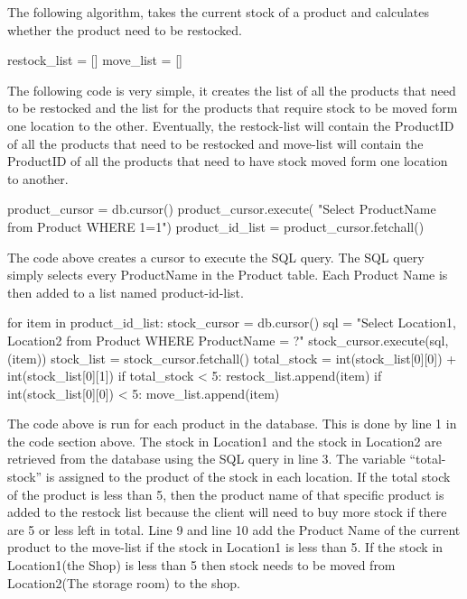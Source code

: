 The following algorithm, takes the current stock of a product and calculates whether the product need to be restocked.


\begin{python}
restock_list = []
move_list = []
\end{python}

The following code is very simple, it creates the list of all the products that need to be restocked and the list for the products that require stock to be moved form one location to the other. Eventually, the restock-list will contain the ProductID of all the products that need to be restocked and move-list will contain the ProductID of all the products that need to have stock moved form one location to another.


\begin{python}
product_cursor = db.cursor()
product_cursor.execute( "Select ProductName from Product WHERE 1=1")
product_id_list = product_cursor.fetchall()
\end{python}

The code above creates a cursor to execute the SQL query. The SQL query simply selects every ProductName in the Product table. Each Product Name is then added to a list named product-id-list. 

\begin{python}
for item in product_id_list:
            stock_cursor = db.cursor()
            sql = "Select Location1, Location2 from Product WHERE ProductName = ?"
            stock_cursor.execute(sql, (item))
            stock_list = stock_cursor.fetchall()
            total_stock = int(stock_list[0][0]) + int(stock_list[0][1])
            if total_stock < 5:
                restock_list.append(item)
            if int(stock_list[0][0]) < 5:
                move_list.append(item)
\end{python}

The code above is run for each product in the database. This is done by line 1 in the code section above. The stock in Location1 and the stock in Location2 are retrieved from the database using the SQL query in line 3. The variable ``total-stock'' is assigned to the product of the stock in each location. If the total stock of the product is less than 5, then the product name of that specific product is added to the restock list because the client will need to buy more stock if there are 5 or less left in total. Line 9 and line 10 add the Product Name of the current product to the move-list if the stock in Location1 is less than 5. If the stock in Location1(the Shop) is less than 5 then stock needs to be moved from Location2(The storage room) to the shop.

